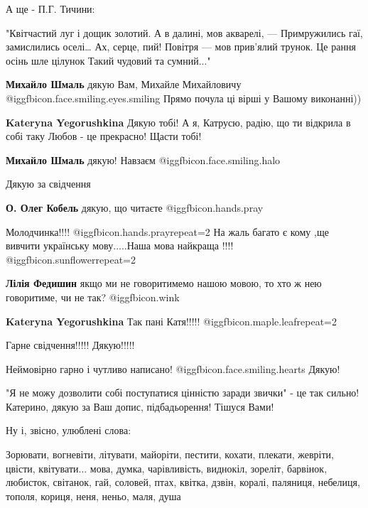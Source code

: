 \begin{itemize}
А ще - П.Г. Тичини: 

\obeycr
"Квітчастий луг і дощик золотий.
А в далині, мов акварелі, —
Примружились гаї, замислились оселі…
Ах, серце, пий!
Повітря — мов прив’ялий трунок.
Це рання осінь шле цілунок
Такий чудовий та сумний..."
\restorecr

\begin{itemize} %
\textbf{Михайло Шмаль} дякую Вам, Михайле Михайловичу @igg{fbicon.face.smiling.eyes.smiling} 
Прямо почула ці вірші у Вашому виконанні))

\textbf{Kateryna Yegorushkina} Дякую тобі! А я, Катрусю, радію, що ти відкрила в собі таку Любов - це прекрасно! Щасти тобі!

\textbf{Михайло Шмаль} дякую! Навзаєм @igg{fbicon.face.smiling.halo} 
\end{itemize} %

Дякую за свідчення

\begin{itemize} %
\textbf{О. Олег Кобель} дякую, що читаєте @igg{fbicon.hands.pray} 
\end{itemize} %

Молодчинка!!!! @igg{fbicon.hands.pray}{repeat=2} На жаль багато є кому ,ще вивчити українську мову.....Наша
мова найкраща !!!! @igg{fbicon.sunflower}{repeat=2} 

\begin{itemize} %
\textbf{Лілія Федишин} якщо ми не говоритимемо нашою мовою, то хто ж нею говоритиме, чи не так? @igg{fbicon.wink} 

\textbf{Kateryna Yegorushkina} Так пані Катя!!!!! @igg{fbicon.maple.leaf}{repeat=2} 
\end{itemize} %

Гарне свідчення!!!!! Дякую!!!!!

Неймовірно гарно і чутливо написано!  @igg{fbicon.face.smiling.hearts}  Дякую!

"Я не можу дозволити собі поступатися цінністю заради звички" - це так сильно!
Катерино, дякую за Ваш допис, підбадьорення! Тішуся Вами!

Ну і, звісно, улюблені слова:

Зорювати, вогневіти, літувати, майоріти, пестити, кохати, плекати, жевріти,
цвісти, квітувати...  мова, думка, чарівливість, виднокіл, зореліт, барвінок,
любисток, світанок, гай, соловей, птах, квітка, дзвін, коралі, паляниця,
небелиця, тополя, кориця, неня, неньо, маля, душа


\end{itemize}
